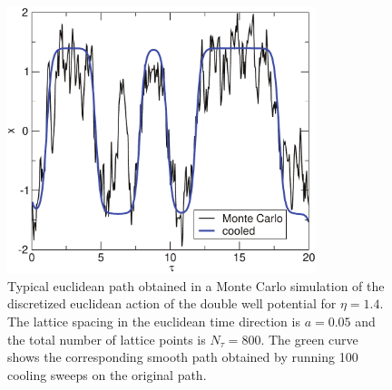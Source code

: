 \begin{figure}[t]
\begin{center}
\includegraphics[width=9cm]{Chapter2-figures/config1.pdf}  
\end{center}  
\caption{\label{fig_path}
Typical euclidean path obtained in a Monte Carlo simulation
of the discretized euclidean action of the double well 
potential for $\eta=1.4$. The lattice spacing in the 
euclidean time direction is $a=0.05$ and the total number 
of lattice points is $N_\tau=800$. The green curve shows 
the corresponding smooth path obtained by running 100 
cooling sweeps on the original path. }
\end{figure}

